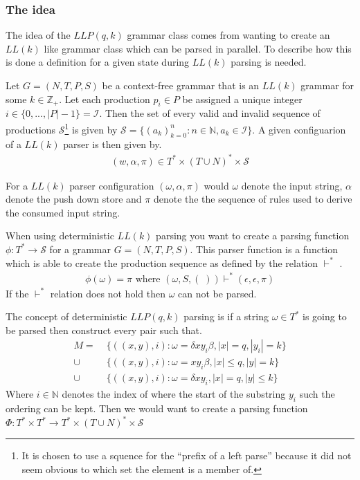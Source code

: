 \subsubsection{The idea}
The idea of the $LLP(q, k)$ grammar class comes from wanting to create an $LL(k)$ like grammar class which can be parsed in parallel. To describe how this is done a definition for a given state during $LL(k)$ parsing is needed.
\begin{definition}
    Let $G = (N, T, P, S)$ be a context-free grammar that is an $LL(k)$ grammar for some $k \in \mathbb{Z}_+$. Let each production $p_i \in P$ be assigned a unique integer $i \in \{0, ..., |P| - 1\} = \mathcal{I}$. Then the set of every valid and invalid sequence of productions $\mathcal{S}$\footnote{It is chosen to use a squence for the ``prefix of  a left parse'' \cite[p. 5]{Vagner2007} because it did not seem obvious to which set the element is a member of.} is given by $\mathcal{S} = \{(a_k)_{k=0}^n : n \in \mathbb{N}, a_k \in \mathcal{I}\}$. A given configuarion \cite[p. 5]{Vagner2007} of a $LL(k)$ parser is then given by.
    \begin{align*}
        (w, \alpha, \pi) \in T^* \times (T \cup N)^* \times \mathcal{S}
    \end{align*}
\end{definition}
\noindent For a $LL(k)$ parser configuration $(\omega, \alpha, \pi)$ would $\omega$ denote the input string, $\alpha$ denote the push down store and $\pi$ denote the the sequence of rules used to derive the consumed input string.

When using deterministic $LL(k)$ parsing you want to create a parsing function $\phi: T^* \to \mathcal{S}$ for a grammar $G = (N, T, P, S)$. This parser function is a function which is able to create the production sequence as defined by the relation $\vdash^*$ \cite[p. 6]{Vagner2007}.
\begin{align*}
    \phi(\omega) = \pi \text{ where } (\omega, S, (\;)) \vdash^* (\epsilon, \epsilon, \pi) 
\end{align*}
If the $\vdash^*$ relation does not hold then $\omega$ can not be parsed. 

The concept of deterministic $LLP(q,k)$ parsing is if a string $\omega \in T^*$ is going to be parsed then construct every pair such that.
\begin{align*}
    M =&\; \{((x, y), i) : \omega = \delta xy_i \beta, |x| = q, |y_i| = k\} \\
    \cup&\; \{((x, y), i) : \omega = xy_i \beta, |x| \leq q, |y| = k\} \\
    \cup&\; \{((x, y), i) : \omega = \delta xy_i, |x| = q, |y| \leq k\}
\end{align*}
Where $i \in \mathbb{N}$ denotes the index of where the start of the substring $y_i$ such the ordering can be kept. Then we would want to create a parsing function $\Phi: T^* \times T^* \to T^* \times (T \cup N)^* \times \mathcal{S}$

